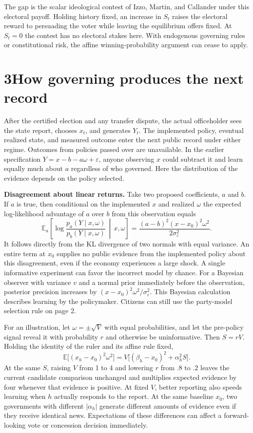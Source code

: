 \documentclass[11pt,letterpaper]{article}
\newcommand{\sect}[1]{\section*{\color{ink}#1}}
\newcommand{\lead}[1]{\textbf{#1}\enspace}
\newcommand{\E}{\mathbb E}
\begin{document}
The gap is the scalar ideological contest of Izzo, Martin, and Callander under this electoral payoff. Holding history fixed, an increase in $S_t$ raises the electoral reward to persuading the voter while leaving the equilibrium offers fixed. At $S_t=0$ the contest has no electoral stakes here. With endogenous governing rules or constitutional risk, the affine winning-probability argument can cease to apply.

\newpage
\sect{3\quad How governing produces the next record}
After the certified election and any transfer dispute, the actual officeholder sees the state report, chooses $x_t$, and generates $Y_t$. The implemented policy, eventual realized state, and measured outcome enter the next public record under either regime. Outcomes from policies passed over are unavailable. In the earlier specification $Y=x-b-a\omega+\varepsilon$, anyone observing $x$ could subtract it and learn equally much about $a$ regardless of who governed. Here the distribution of the evidence depends on the policy selected.

\lead{Disagreement about linear returns.} Take two proposed coefficients, $a$ and $b$. If $a$ is true, then conditional on the implemented $x$ and realized $\omega$ the expected log-likelihood advantage of $a$ over $b$ from this observation equals
\[
 \mathbb E_a\!\left[\log\frac{p_a(Y\mid x,\omega)}{p_b(Y\mid x,\omega)}
       \,\middle|\,x,\omega\right]
   =\frac{(a-b)^2(x-x_0)^2\omega^2}{2\sigma_\varepsilon^2}.
\]
It follows directly from the KL divergence of two normals with equal variance. An entire term at $x_0$ supplies no public evidence from the implemented policy about this disagreement, even if the economy experiences a large shock. A single informative experiment can favor the incorrect model by chance. For a Bayesian observer with variance $v$ and a normal prior immediately before the observation, posterior precision increases by $(x-x_0)^2\omega^2/\sigma_\varepsilon^2$. This Bayesian calculation describes learning by the policymaker. Citizens can still use the party-model selection rule on page 2.

For an illustration, let $\omega=\pm\sqrt{V}$ with equal probabilities, and let the pre-policy signal reveal it with probability $r$ and otherwise be uninformative. Then $S=rV$. Holding the identity of the ruler and its affine rule fixed,
\[
 \E\big[(x_h-x_0)^2\omega^2\big]
    =V\big[(\beta_h-x_0)^2+\alpha_h^2 S\big].
\]
At the same $S$, raising $V$ from 1 to 4 and lowering $r$ from $.8$ to $.2$ leaves the current candidate comparison unchanged and multiplies expected evidence by four whenever that evidence is positive. At fixed $V$, better reporting also speeds learning when $h$ actually responds to the report. At the same baseline $x_0$, two governments with different $|\alpha_h|$ generate different amounts of evidence even if they receive identical news. Expectations of these differences can affect a forward-looking vote or concession decision immediately.
\end{document}
